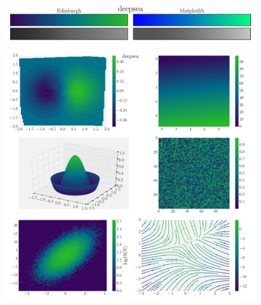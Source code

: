 \documentclass[10pt,a4paper]{article}
\begin{document}
\newpage
\begin{figure}[ht]
  \centering
  \includegraphics[width=0.99\textwidth]{deepseaBars.pdf}
  \includegraphics[width=0.99\textwidth]{deepseaExamples.pdf}
\end{figure}



% 
% 
% 
% 
% 
\end{document}
